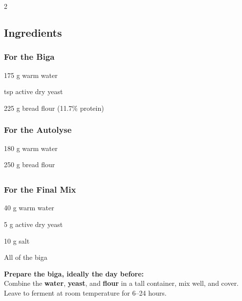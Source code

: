 \newpage
{}

\begin{multicols}{2}
	\subsection*{Ingredients}
	
	\subsubsection*{For the Biga}
	\begin{ingredients}
		\item 175 g warm water
		\item {} tsp active dry yeast
		\item 225 g bread flour (11.7\% protein)
	\end{ingredients}
	
	\subsubsection*{For the Autolyse}
	\begin{ingredients}
		\item 180 g warm water
		\item 250 g bread flour
	\end{ingredients}
	\columnbreak
	\subsection*{ }
	\subsubsection*{For the Final Mix}
	\begin{ingredients}
		\item 40 g warm water
		\item 5 g active dry yeast
		\item 10 g salt
		\item All of the biga
	\end{ingredients}
\end{multicols}

\textbf{Prepare the biga, ideally the day before:} \\
Combine the \textbf{water}, \textbf{yeast}, and \textbf{flour} in a tall container, mix well, and cover.
Leave to ferment at room temperature for 6--24 hours.

